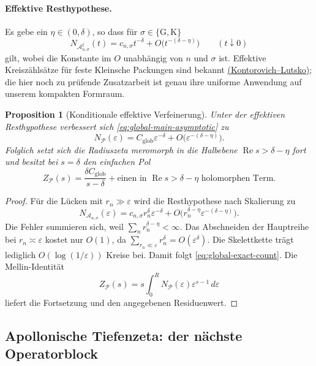 \documentclass[11pt,a4paper]{article}
\newtheorem{proposition}[remark]{Proposition}
\begin{document}
\paragraph{Effektive Resthypothese.}
Es gebe ein $\eta\in(0,\delta)$, so dass für
$\sigma\in\{\mathrm G,\mathrm K\}$
\[
 N_{\mathcal A_{n,\sigma}^{\sharp}}(t)
 =c_{n,\sigma}t^{-\delta}
  +O\bigl(t^{-(\delta-\eta)}\bigr)
 \qquad(t\downarrow0)
\]
gilt, wobei die Konstante im $O$ unabhängig von $n$ und $\sigma$ ist.
Effektive Kreiszählsätze für feste Kleinsche Packungen sind bekannt
\href{https://arxiv.org/abs/2205.13004}{(Kontorovich--Lutsko)};
die hier noch zu prüfende Zusatzarbeit ist genau ihre uniforme Anwendung auf
unserem kompakten Formraum.

\begin{proposition}[Konditionale effektive Verfeinerung]
Unter der effektiven Resthypothese verbessert sich
\eqref{eq:global-main-asymptotic} zu
\begin{equation}\label{eq:global-exact-count}
 N_{\mathcal P}(\varepsilon)
 =C_{\mathrm{glob}}\varepsilon^{-\delta}
  +O\bigl(\varepsilon^{-(\delta-\eta)}\bigr).
\end{equation}
Folglich setzt sich die Radiuszeta meromorph in die Halbebene
$\operatorname{Re}s>\delta-\eta$ fort und besitzt bei $s=\delta$ den
einfachen Pol
\[
 Z_{\mathcal P}(s)
 =\frac{\delta C_{\mathrm{glob}}}{s-\delta}
  +\text{einen in }\operatorname{Re}s>\delta-\eta
  \text{ holomorphen Term}.
\]
\end{proposition}

\begin{proof}
Für die Lücken mit $r_n\gg\varepsilon$ wird die Resthypothese nach
Skalierung zu
\[
 N_{\mathcal A_{n,\sigma}}(\varepsilon)
 =c_{n,\sigma}r_n^\delta\varepsilon^{-\delta}
  +O\bigl(r_n^{\delta-\eta}
  \varepsilon^{-(\delta-\eta)}\bigr).
\]
Die Fehler summieren sich, weil
$\sum_n r_n^{\delta-\eta}<\infty$. Das Abschneiden der Hauptreihe bei
$r_n\asymp\varepsilon$ kostet nur $O(1)$, da
$\sum_{r_n\ll\varepsilon}r_n^\delta=O(\varepsilon^\delta)$.
Die Skelettkette trägt lediglich $O(\log(1/\varepsilon))$ Kreise bei.
Damit folgt \eqref{eq:global-exact-count}. Die Mellin-Identität
\[
 Z_{\mathcal P}(s)
 =s\int_0^{R}N_{\mathcal P}(\varepsilon)
  \varepsilon^{s-1}\,d\varepsilon
\]
liefert die Fortsetzung und den angegebenen Residuenwert.
\end{proof}

\subsection{Apollonische Tiefenzeta: der nächste Operatorblock}
\end{document}
